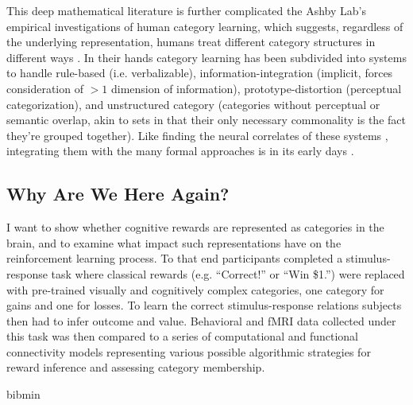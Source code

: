 \documentclass[doc,12pt]{apa}        %
\begin{document}
This deep mathematical literature is further complicated the Ashby Lab's empirical investigations of human category learning, which suggests, regardless of the underlying representation, humans treat different category structures in different ways \cite{Ashby:2011p9148}.  In their hands category learning has been subdivided
into systems to handle rule-based (i.e. verbalizable), information-integration (implicit, forces consideration of $>1$ dimension of information), prototype-distortion (perceptual categorization), and unstructured category (categories without perceptual or semantic overlap, akin to sets in that their only necessary commonality is the fact they're grouped together).  Like finding the neural correlates of these systems \cite{Ashby:2005p9152,Ashby:2006p9153}, integrating them with the many formal approaches is in its early days \cite{Ashby:2011p9148}.

\subsection{Why Are We Here Again?}
\label{sec:goals}
I want to show whether cognitive rewards are represented as categories in the brain, and to examine what impact such representations have on the reinforcement learning process.  To that end participants completed a stimulus-response task where classical rewards (e.g. ``Correct!'' or ``Win \$1.'') were replaced with pre-trained visually and cognitively complex categories, one category for gains and one for losses.  To learn the correct stimulus-response relations subjects then had to infer outcome and value.   Behavioral and fMRI data collected under this task was then compared to a series of computational and functional connectivity models representing various possible algorithmic strategies for reward inference and assessing category membership.

\newpage
 {bibmin}
\end{document}

